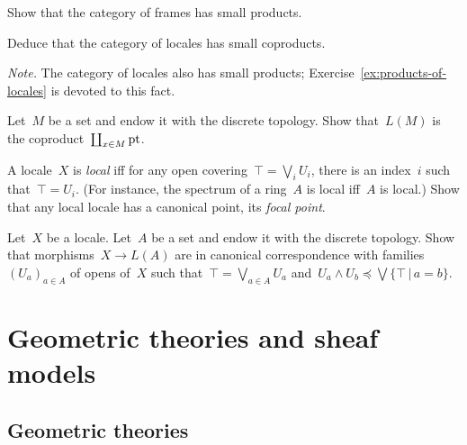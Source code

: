\documentclass{ws-rv9x6}
\begin{document}
{\begin{exercise}%
\begin{alphlist}[(c)]
\item Show that the category of frames has small products.
\item Deduce that the category of locales has small coproducts.\smallskip

{\scriptsize\emph{Note.} The category of locales also has small products;
Exercise~\ref{ex:products-of-locales} is devoted to this fact.\par}
\item Let~$M$ be a set and endow it with the discrete topology. Show
that~$L(M)$ is the coproduct~$\coprod_{x \in M} \mathrm{pt}$.
\end{alphlist}
\end{exercise}

\begin{exercise}%
\label{ex:local-locales}%
A locale~$X$ is \emph{local} iff for any open covering~$\top = \bigvee_i U_i$,
there is an index~$i$ such that~$\top = U_i$. (For instance, the spectrum of a
ring~$A$ is local iff~$A$ is local.)
Show that any local locale has a canonical point, its \emph{focal point}.
\end{exercise}

\begin{exercise}%
Let~$X$ be a locale. Let~$A$ be a set and endow it with the discrete topology. Show
that morphisms~$X \to L(A)$ are in canonical correspondence with
families~$(U_a)_{a \in A}$ of opens of~$X$ such that~$\top = \bigvee_{a \in A}
U_a$ and~$U_a \wedge U_b \preceq \bigvee\{ \top \,|\, a = b \}$.
\end{exercise}


\section{Geometric theories and sheaf models}

\subsection{Geometric theories}
\label{sect:geometric-theories}

}
\end{document}
